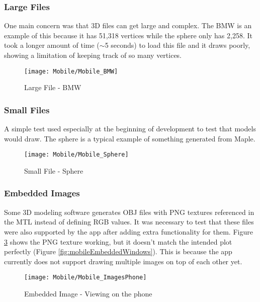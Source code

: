         \subsubsection{Large Files}
        
            One main concern was that 3D files can get large and complex. The BMW is an example of this because it has 51,318 vertices while the sphere only has 2,258. It took a longer amount of time ($\sim$5 seconds) to load this file and it draws poorly, showing a limitation of keeping track of so many vertices.
            \begin{figure}[H]
                \texttt{[image: Mobile/Mobile\_BMW]}
                \centering
                \caption{Large File - BMW}
                \label{fig:mobileBMW}
            \end{figure}
    
        \subsubsection{Small Files}
            A simple test used especially at the beginning of development to test that models would draw. The sphere is a typical example of something generated from Maple. 
        
            \begin{figure}[H]
                \texttt{[image: Mobile/Mobile\_Sphere]}
                \centering
                \caption{Small File - Sphere}
                \label{fig:mobileSphere}
            \end{figure}
            
        \subsubsection{Embedded Images}
            
            Some 3D modeling software generates OBJ files with PNG textures referenced in the MTL instead of defining RGB values. It was necessary to test that these files were also supported by the app after adding extra functionality for them. Figure \ref{fig:mobileEmbeddedPhone} shows the PNG texture working, but it doesn't match the intended plot perfectly (Figure \ref{fig:mobileEmbeddedWindows}). This is because the app currently does not support drawing multiple images on top of each other yet.
        
            \begin{figure}[H]
                \texttt{[image: Mobile/Mobile\_ImagesPhone]}
                \centering
                \caption{Embedded Image - Viewing on the phone}
                \label{fig:mobileEmbeddedPhone}
            \end{figure}

